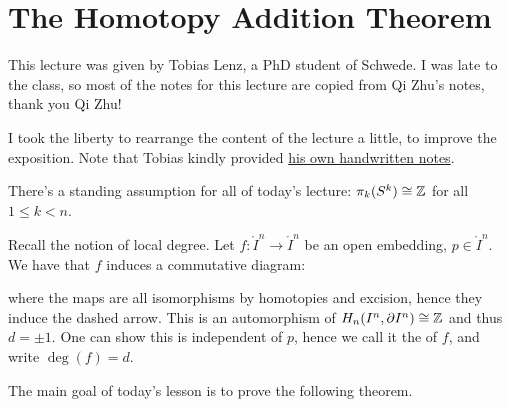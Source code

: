
\section{The Homotopy Addition Theorem}


This lecture was given by Tobias Lenz, a PhD student of Schwede. I was late to the class, so most of the notes for this lecture are copied from Qi Zhu's notes, thank you Qi Zhu!

\begin{warning}
I took the liberty to rearrange the content of the lecture a little, to improve the exposition. Note that Tobias kindly provided \href{https://uni-bonn.sciebo.de/s/OcE4uI7eVAPzhXg}{his own handwritten notes}.
\end{warning}

\begin{remark}
There's a standing assumption for all of today's lecture: $\pi_k(S^k)\cong{\mathbb Z}$ for all $1\leq k<n$.
\end{remark}

Recall the notion of local degree. Let $f:\ring I^n\to\ring I^n $ be an open embedding, $p\in\ring I^n$. We have that $f$ induces a commutative diagram:
\begin{center}
\end{center}
where the maps are all isomorphisms by homotopies and excision, hence they induce the dashed arrow. This is an automorphism of $H_n(I^n,\partial I^n)\cong{\mathbb Z}$ and thus $d=\pm1$. One can show this is independent of $p$, hence we call it the  of $f$, and write $\deg(f)=d$.

The main goal of today's lesson is to prove the following theorem.

